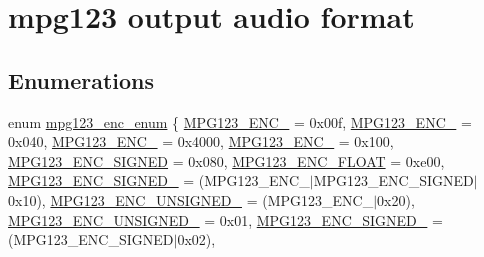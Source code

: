 \hypertarget{group__mpg123__output}{}\section{mpg123 output audio format}
\label{group__mpg123__output}
\subsection*{Enumerations}
\begin{DoxyCompactItemize}
\item 
enum \hyperlink{group__mpg123__output_gafc8cdd60a8d3c30a09249869d835c634}{mpg123\+\_\+enc\+\_\+enum} \{ \newline
\hyperlink{group__mpg123__output_ggafc8cdd60a8d3c30a09249869d835c634a2fa0533806b214e601e3d82beecfeabd}{M\+P\+G123\+\_\+\+E\+N\+C\+\_} = 0x00f, 
\hyperlink{group__mpg123__output_ggafc8cdd60a8d3c30a09249869d835c634aaf35ec1ada285a3441847a4a9f3bf9bb}{M\+P\+G123\+\_\+\+E\+N\+C\+\_} = 0x040, 
\hyperlink{group__mpg123__output_ggafc8cdd60a8d3c30a09249869d835c634aa2076a6a51064681b0c9676e74b387cd}{M\+P\+G123\+\_\+\+E\+N\+C\+\_} = 0x4000, 
\hyperlink{group__mpg123__output_ggafc8cdd60a8d3c30a09249869d835c634a2dcc316cb25c3f9b4f5e43c29a2586ee}{M\+P\+G123\+\_\+\+E\+N\+C\+\_} = 0x100, 
\newline
\hyperlink{group__mpg123__output_ggafc8cdd60a8d3c30a09249869d835c634a52ca156ac348f6f0b992dbdc4b7216d1}{M\+P\+G123\+\_\+\+E\+N\+C\+\_\+\+S\+I\+G\+N\+ED} = 0x080, 
\hyperlink{group__mpg123__output_ggafc8cdd60a8d3c30a09249869d835c634ac15cd5182ba686b94c63978bc140f44d}{M\+P\+G123\+\_\+\+E\+N\+C\+\_\+\+F\+L\+O\+AT} = 0xe00, 
\hyperlink{group__mpg123__output_ggafc8cdd60a8d3c30a09249869d835c634a0bbd04130b54eb8e4b336e8551459279}{M\+P\+G123\+\_\+\+E\+N\+C\+\_\+\+S\+I\+G\+N\+E\+D\+\_} = (M\+P\+G123\+\_\+\+E\+N\+C\+\_$\vert$\+M\+P\+G123\+\_\+\+E\+N\+C\+\_\+\+S\+I\+G\+N\+E\+D$\vert$0x10), 
\hyperlink{group__mpg123__output_ggafc8cdd60a8d3c30a09249869d835c634ab885d871406ca8a9f7aa386874d8f329}{M\+P\+G123\+\_\+\+E\+N\+C\+\_\+\+U\+N\+S\+I\+G\+N\+E\+D\+\_} = (M\+P\+G123\+\_\+\+E\+N\+C\+\_$\vert$0x20), 
\newline
\hyperlink{group__mpg123__output_ggafc8cdd60a8d3c30a09249869d835c634aedd7b2c52270c701e90d655688316a31}{M\+P\+G123\+\_\+\+E\+N\+C\+\_\+\+U\+N\+S\+I\+G\+N\+E\+D\+\_} = 0x01, 
\hyperlink{group__mpg123__output_ggafc8cdd60a8d3c30a09249869d835c634a788d30500069c25cddeb5a87efa1dd31}{M\+P\+G123\+\_\+\+E\+N\+C\+\_\+\+S\+I\+G\+N\+E\+D\+\_} = (M\+P\+G123\+\_\+\+E\+N\+C\+\_\+\+S\+I\+G\+N\+E\+D$\vert$0x02), 

\end{DoxyCompactItemize}

